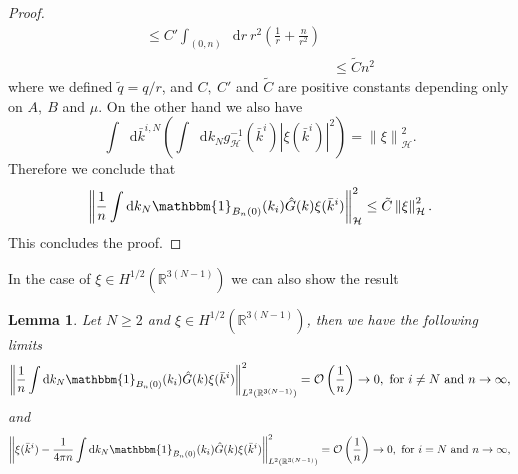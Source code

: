 \documentclass[a4paper,11pt]{article}
\newcommand{\norm}[1]{\left\lVert #1 \right\rVert}
\newcommand{\abs}[1]{\left\lvert #1 \right\rvert}
\newcommand*\diff{\mathop{}\!\mathrm{d}}
\newcommand{\R}{\mathbb{R}}
\newtheorem{lemma}{Lemma}
\numberwithin{equation}{section}
\begin{document}
\begin{proof}
\begin{equation}
\begin{aligned}
	\leq C'\int_{(0,n)}\diff r\ r^2\left(\frac{1}{r}+\frac{n}{r^2}\right)\\&
	\leq\tilde{C}n^2
	\end{aligned}
	\end{equation}
	where we defined $ \tilde{q}=q/r $, and $ C,\ C' $ and $ \tilde{C} $ are positive constants depending only on $ A,\ B $ and $ \mu $. On the other hand we also have \begin{equation}
	\int\diff \bar{k}^{i,N}\left(\int\diff k_N g_\mathcal{H}^{-1}(\bar{k}^i)\abs{\xi(\bar{k}^i)}^2\right)=\norm{\xi}^2_{\mathcal{H}}.
	\end{equation}
	Therefore we conclude that
	\begin{equation}
	\begin{aligned}
	\norm{\frac{1}{n}\int \diff k_N \mathbbm{1}_{B_n(0)}(k_i)\hat{G}(k)\xi(\bar{k}^i)}^2_\mathcal{H}\leq\tilde{C}\norm{\xi}^2_{\mathcal{H}}.
	\end{aligned}
	\end{equation}
	This concludes the proof.
\end{proof}
In the case of $ \xi\in H^{1/2}(\R^{3(N-1)}) $ we can also show the result
\begin{lemma}\label{lemmaxiCon}
	 Let $ N\geq2 $ and $ \xi\in H^{1/2}(\R^{3(N-1)}) $, then we have the following limits\begin{equation}
	 	\norm{\frac{1}{n}\int \diff k_N \mathbbm{1}_{B_n(0)}(k_i)\hat{G}(k)\xi(\bar{k}^i)}^2_{L^2(\R^{3(N-1)})}=\mathcal{O}\left(\frac{1}{n}\right)\to 0,\text{ for }i\neq N\text{ and }n\to\infty,
	 \end{equation}
	 and \begin{equation}
		\norm{\xi(\bar{k}^i)-\frac{1}{4\pi n}\int \diff k_N \mathbbm{1}_{B_n(0)}(k_i)\hat{G}(k)\xi(\bar{k}^i)}^2_{L^2(\R^{3(N-1)})}=\mathcal{O}\left(\frac{1}{n}\right)\to 0,\text{ for }i= N\text{ and }n\to\infty,
	 \end{equation}
\end{lemma}
\end{document}
